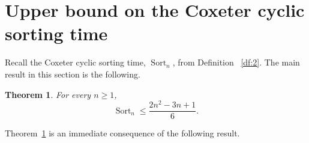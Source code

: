 \documentclass[11pt]{amsart}
\newtheorem{theorem}{Theorem}[section]
\newtheorem{definition}[theorem]{Definition}
\numberwithin{equation}{section}
\newcommand{\todo}[1]{\vspace{5 mm}\par \noindent
\marginpar{\textsc{ToDo}} \framebox{\begin{minipage}[c]{0.95
\textwidth}
 #1 \end{minipage}}\vspace{5 mm}\par}
\newcommand{\ZZ}{{\mathbb {Z}}}
\newcommand{\inv}{{\operatorname{inv}}}
\newcommand{\Einv}{{\operatorname{Einv}}}
\newcommand{\dist}{{\operatorname{dist}}}
\newcommand{\Sort}{{\operatorname{Sort}}}
\begin{document}
\section{Upper bound on the Coxeter cyclic sorting time}\label{sec:upper sorting}%




Recall the  Coxeter cyclic sorting time, $\Sort_n$, from Definition ~\ref{df:2}. The main result in this section is the following. 




\begin{theorem}\label{thm:u0}
        For every $n\ge 1$,
    \[
        \Sort_n %
        \le \frac{2n^2 - 3n + 1}{6}.
    \]
\end{theorem}


Theorem~\ref{thm:u0} is an immediate consequence of the following result. 




\end{document}
